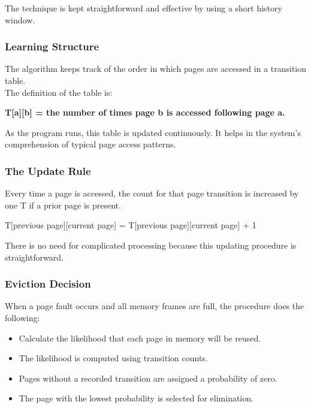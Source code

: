 \documentclass[conference]{IEEEtran}
\begin{document}
The technique is kept straightforward and effective by using a short history window.
\vspace{0.7\baselineskip}


\subsubsection{Learning Structure}

The algorithm keeps track of the order in which pages are accessed in a transition table.\\
The definition of the table is:

\textbf{T[a][b] = the number of times page b is accessed following page a.}

As the program runs, this table is updated continuously. It helps in the system's comprehension of typical page access patterns.
\vspace{0.7\baselineskip}


\subsubsection{The Update Rule}

Every time a page is accessed, the count for that page transition is increased by one T if a prior page is present.

T[previous page][current page] = T[previous page][current page] + 1

There is no need for complicated processing because this updating procedure is straightforward.
\vspace{0.7\baselineskip}


\subsubsection{Eviction Decision}

When a page fault occurs and all memory frames are full, the procedure does the following:

\begin{itemize}
\item Calculate the likelihood that each page in memory will be reused.
\item The likelihood is computed using transition counts.
\item Pages without a recorded transition are assigned a probability of zero.
\item The page with the lowest probability is selected for elimination.
\end{itemize}
\end{document}
